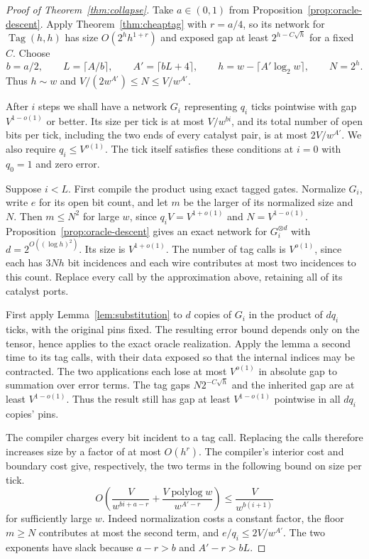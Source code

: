 \begin{proof}[Proof of Theorem~\ref{thm:collapse}]
Take $a\in(0,1)$ from Proposition~\ref{prop:oracle-descent}. Apply
Theorem~\ref{thm:cheaptag} with $r=a/4$, so its network for
$\operatorname{Tag}(h,h)$ has size $O(2^h h^{1+r})$ and exposed gap
at least $2^{h-C\sqrt h}$ for a fixed $C$. Choose
\[
 b=a/2,\qquad L=\lceil A/b\rceil,\qquad
 A'=\lceil bL+4\rceil,\qquad
 h=w-\lceil A'\log_2 w\rceil,\qquad N=2^h .
\]
Thus $h\sim w$ and $V/(2w^{A'})\le N\le V/w^{A'}$.

After $i$ steps we shall have a network $G_i$ representing $q_i$ ticks
pointwise with gap $V^{1-o(1)}$ or better. Its size per tick is at most
$V/w^{bi}$, and its total number of open bits per tick, including the
two ends of every catalyst pair, is at most $2V/w^{A'}$.
We also require $q_i\le V^{o(1)}$. The tick itself satisfies these
conditions at $i=0$ with $q_0=1$ and zero error.

Suppose $i<L$. First compile the product using exact tagged gates.
Normalize $G_i$, write $e$ for its open bit count, and
let $m$ be the larger of its normalized size and $N$. Then
$m\le N^2$ for large $w$, since $q_i V=V^{1+o(1)}$ and
$N=V^{1-o(1)}$. Proposition~\ref{prop:oracle-descent} gives an exact
network for $G_i^{\otimes d}$ with
$d=2^{O((\log h)^2)}$. Its size is $V^{1+o(1)}$. The number of tag
calls is $V^{o(1)}$, since each has $3Nh$ bit incidences and each
wire contributes at most two incidences to this count. Replace every
call by the approximation above, retaining all of its catalyst ports.

First apply Lemma~\ref{lem:substitution} to $d$ copies of $G_i$ in
the product of $dq_i$ ticks, with the original pins fixed.
The resulting error bound depends only on the tensor, hence applies
to the exact oracle realization. Apply the lemma a second time to its
tag calls, with their data exposed so that the internal indices may be
contracted. The two applications each lose at most $V^{o(1)}$ in
absolute gap to summation over error terms. The tag gaps
$N2^{-C\sqrt h}$ and the inherited gap are at least $V^{1-o(1)}$.
Thus the result still has gap at least $V^{1-o(1)}$ pointwise in all
$dq_i$ copies' pins.

The compiler charges every bit incident to a tag call. Replacing the
calls therefore increases size by a factor of at most $O(h^r)$.
The compiler's interior cost and boundary cost give, respectively, the
two terms in the following bound on size per tick.
\[
 O\left(\frac{V}{w^{bi+a-r}}+
         \frac{V\operatorname{polylog} w}{w^{A'-r}}\right)
              \le \frac{V}{w^{b(i+1)}}
\]
for sufficiently large $w$. Indeed normalization costs a constant
factor, the floor $m\ge N$ contributes at most the second term, and
$e/q_i\le 2V/w^{A'}$. The two exponents have slack because
$a-r>b$ and $A'-r>bL$.


\end{proof}
